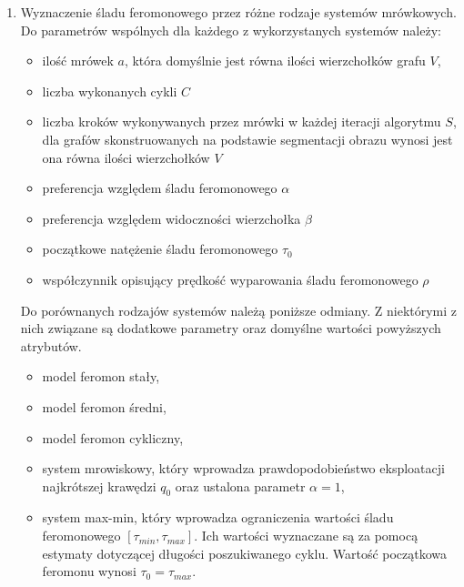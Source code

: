 {\begin{enumerate}
\begin{itemize}
            \item Metoda oparta o krawędzie. Do jej parametrów należy algorytm segmentacji oraz docelowa liczba
            segmentów $N_s$ związana z ilością krawędzi grafu. Podczas badań wykorzystano algorytmy prostego podziału na
            na prostokąty, algorytm k-średnich oraz algorytm \textit{SLIC} służący do konstrukcji superpikseli.
        \end{itemize}

        \item Wyznaczenie śladu feromonowego przez różne rodzaje systemów mrówkowych. Do parametrów wspólnych dla
        każdego z wykorzystanych systemów należy:
        \begin{itemize}
            \item ilość mrówek $a$, która domyślnie jest równa ilości wierzchołków grafu $V$,
            \item liczba wykonanych cykli $C$
            \item liczba kroków wykonywanych przez mrówki w każdej iteracji algorytmu $S$, dla grafów skonstruowanych na
            podstawie segmentacji obrazu wynosi jest ona równa ilości wierzchołków $V$
            \item preferencja względem śladu feromonowego $\alpha$
            \item preferencja względem widoczności wierzchołka $\beta$
            \item początkowe natężenie śladu feromonowego $\tau_0$
            \item współczynnik opisujący prędkość wyparowania śladu feromonowego $\rho$
        \end{itemize}

        Do porównanych rodzajów systemów należą poniższe odmiany. Z niektórymi z nich związane są dodatkowe parametry
        oraz domyślne wartości powyższych atrybutów.
        \begin{itemize}
            \item model feromon stały,
            \item model feromon średni,
            \item model feromon cykliczny,
            \item system mrowiskowy, który wprowadza prawdopodobieństwo eksploatacji najkrótszej krawędzi $q_0$ oraz
            ustalona parametr $\alpha = 1$,
            \item system max-min, który wprowadza ograniczenia wartości śladu feromonowego $[\tau_{min}, \tau_{max}]$.
            Ich wartości wyznaczane są za pomocą estymaty dotyczącej długości poszukiwanego cyklu. Wartość początkowa
            feromonu wynosi $\tau_0 = \tau_{max}$.
        \end{itemize}
    \end{enumerate}

}
